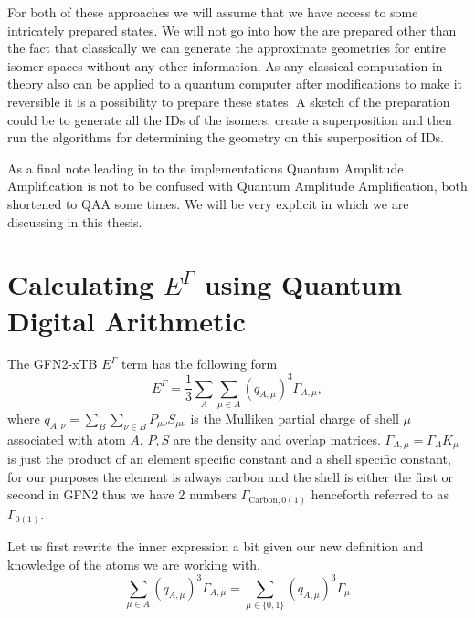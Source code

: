 

For both of these approaches we will assume that we have access to some intricately prepared states. 
We will not go into how the are prepared other than the fact that classically we can generate the approximate geometries for entire isomer spaces without any other information. 
As any classical computation in theory also can be applied to a quantum computer after modifications to make it reversible it is a possibility to prepare these states. 
A sketch of the preparation could be to generate all the IDs of the isomers, create a superposition and then run the algorithms for determining the geometry on this superposition of IDs. 

As a final note leading in to the implementations Quantum Amplitude Amplification is not to be confused with Quantum Amplitude Amplification, both shortened to QAA some times. 
We will be very explicit in which we are discussing in this thesis.
\section{Calculating $E^\Gamma$ using Quantum Digital Arithmetic}
The GFN2-xTB $E^\Gamma$ term has the following form\cite{bannwarth2021}
\begin{equation}
    E^\Gamma = \frac{1}{3}\sum_A\sum_{\mu\in A} (q_{A,\mu})^3\Gamma_{A,\mu},
\end{equation}
where $q_{A,\nu}=\sum_B\sum_{\nu\in B}P_{\mu\nu}S_{\mu\nu}$ is the Mulliken partial charge of shell $\mu$ associated with atom $A$. $P, S$ are the density and overlap matrices. $\Gamma_{A,\mu} = \Gamma_A K_\mu$ is just the product of an element specific constant and a shell specific constant, for our purposes the element is always carbon and the shell is either the first or second in GFN2 thus we have 2 numbers $\Gamma_{\text{Carbon},0(1)}$ henceforth referred to as $\varGamma_{0(1)}$. 

\vspace{\baselineskip}
\noindent
Let us first rewrite the inner expression a bit given our new definition and knowledge of the atoms we are working with. 
\begin{equation}
    \sum_{\mu\in A} (q_{A,\mu})^3\Gamma_{A,\mu} = \sum_{\mu \in \{0,1\}} (q_{A,\mu})^3\varGamma_{\mu}
\end{equation}

